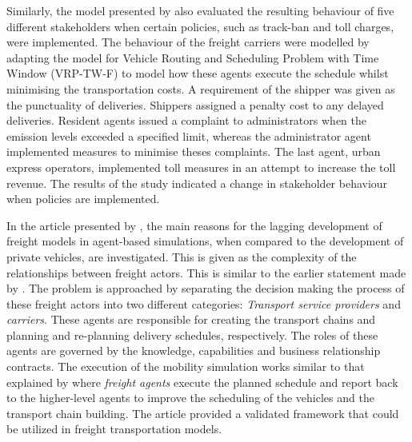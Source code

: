Similarly, the model presented by \citet{taniguchi2005evaluating} also evaluated the resulting behaviour of five different stakeholders when certain policies, such as track-ban and toll charges, were implemented. The behaviour of the freight carriers were modelled by adapting the model for Vehicle Routing and Scheduling Problem with Time Window (VRP-TW-F) to model how these agents execute the schedule whilst minimising the transportation costs. A requirement of the shipper was given as the punctuality of deliveries. Shippers assigned a penalty cost to any delayed deliveries. Resident agents issued a complaint to administrators when the emission levels exceeded a specified limit, whereas the administrator agent implemented measures to minimise theses complaints. The last agent, urban express operators, implemented toll measures in an attempt to increase the toll revenue. The results of the study indicated a change in stakeholder behaviour when policies are implemented.\par

In the article presented by \citet{schroeder2012towards}, the main reasons for the lagging development of freight models in agent-based simulations, when compared to the development of private vehicles, are investigated. This is given as the complexity of the relationships between freight actors. This is similar to the earlier statement made by \citet{joubert2010large}. The problem is approached by separating the decision making the process of these freight actors into two different categories: \textit{Transport service providers} and \textit{carriers}. These agents are responsible for creating the transport chains and planning and re-planning delivery schedules, respectively. The roles of these agents are governed by the knowledge, capabilities and business relationship contracts. The execution of the mobility simulation works similar to that explained by \citet{zilske2012adding} where \textit{freight agents} execute the planned schedule and report back to the higher-level agents to improve the scheduling of the vehicles and the transport chain building. The article provided a validated framework that could be utilized in freight transportation models.\par

